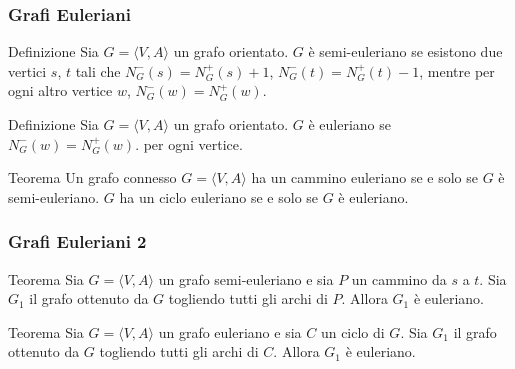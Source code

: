 \begin{frame}[fragile]
\frametitle{Grafi Euleriani}
\begin{block}{Definizione}
Sia $G=\langle  V,A \rangle$ un grafo orientato.
$G$ è semi-euleriano se esistono due vertici $s$, $t$ tali che $N^{-}_{G}(s) =
N^{+}_{G}(s) +1$,  $N^{-}_{G}(t) = N^{+}_{G}(t) -1$, mentre per ogni altro
vertice $w$,  $N^{-}_{G}(w) =N^{+}_{G}(w)$.
\end{block}

\begin{block}{Definizione}
Sia $G=\langle  V,A \rangle$ un grafo orientato.
$G$ è euleriano se $N^{-}_{G}(w) =N^{+}_{G}(w)$. per ogni
vertice.
\end{block}

\begin{block}{Teorema}
Un grafo connesso $G=\langle  V,A \rangle$ ha un cammino euleriano se e solo se $G$ è semi-euleriano.
$G$ ha un ciclo euleriano se e solo se $G$ è euleriano.
\end{block}
\end{frame}


\begin{frame}[fragile]
\frametitle{Grafi Euleriani 2}

\begin{block}{Teorema}
Sia $G=\langle  V,A \rangle$ un grafo semi-euleriano e sia $P$ un  cammino da $s$ a $t$.
Sia $G_{1}$ il grafo ottenuto da $G$ togliendo tutti gli archi di $P$.
Allora $G_{1}$ è euleriano.
\end{block}

\begin{block}{Teorema}
Sia $G=\langle  V,A \rangle$ un grafo euleriano e sia $C$ un ciclo di $G$.
Sia $G_{1}$ il grafo ottenuto da $G$ togliendo tutti gli archi di $C$.
Allora $G_{1}$ è euleriano.
\end{block}
\end{frame}




